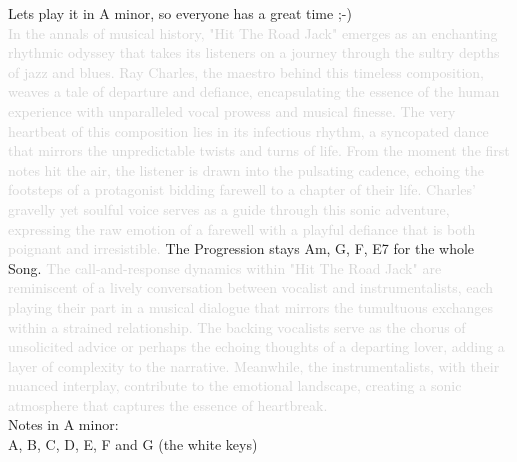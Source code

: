 Lets play it in A minor, so everyone has a great time ;-)\\
\textcolor{lightgray}{In the annals of musical history, "Hit The Road Jack" emerges as an enchanting rhythmic odyssey that takes its listeners on a journey through the sultry depths of jazz and blues. Ray Charles, the maestro behind this timeless composition, weaves a tale of departure and defiance, encapsulating the essence of the human experience with unparalleled vocal prowess and musical finesse.
The very heartbeat of this composition lies in its infectious rhythm, a syncopated dance that mirrors the unpredictable twists and turns of life. From the moment the first notes hit the air, the listener is drawn into the pulsating cadence, echoing the footsteps of a protagonist bidding farewell to a chapter of their life. Charles' gravelly yet soulful voice serves as a guide through this sonic adventure, expressing the raw emotion of a farewell with a playful defiance that is both poignant and irresistible.
} The Progression stays Am, G, F, E7 for the whole Song.
\textcolor{lightgray}{The call-and-response dynamics within "Hit The Road Jack" are reminiscent of a lively conversation between vocalist and instrumentalists, each playing their part in a musical dialogue that mirrors the tumultuous exchanges within a strained relationship. The backing vocalists serve as the chorus of unsolicited advice or perhaps the echoing thoughts of a departing lover, adding a layer of complexity to the narrative. Meanwhile, the instrumentalists, with their nuanced interplay, contribute to the emotional landscape, creating a sonic atmosphere that captures the essence of heartbreak.}\\

Notes in A minor:\\

A, B, C, D, E, F and G (the white keys)
